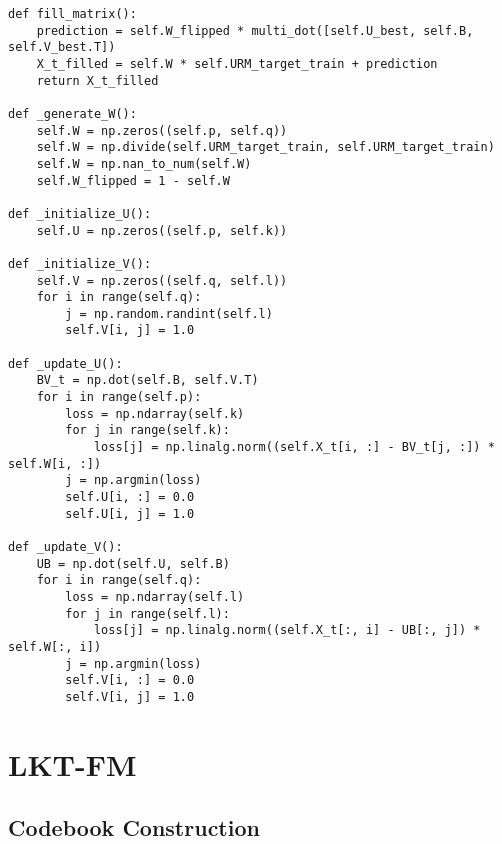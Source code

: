\begin{verbatim}
def fill_matrix():
    prediction = self.W_flipped * multi_dot([self.U_best, self.B, self.V_best.T])
    X_t_filled = self.W * self.URM_target_train + prediction
    return X_t_filled

def _generate_W():
    self.W = np.zeros((self.p, self.q))
    self.W = np.divide(self.URM_target_train, self.URM_target_train)
    self.W = np.nan_to_num(self.W)
    self.W_flipped = 1 - self.W

def _initialize_U():
    self.U = np.zeros((self.p, self.k))

def _initialize_V():
    self.V = np.zeros((self.q, self.l))
    for i in range(self.q):
        j = np.random.randint(self.l)
        self.V[i, j] = 1.0

def _update_U():
    BV_t = np.dot(self.B, self.V.T)
    for i in range(self.p):
        loss = np.ndarray(self.k)
        for j in range(self.k):
            loss[j] = np.linalg.norm((self.X_t[i, :] - BV_t[j, :]) * self.W[i, :])
        j = np.argmin(loss)
        self.U[i, :] = 0.0
        self.U[i, j] = 1.0

def _update_V():
    UB = np.dot(self.U, self.B)
    for i in range(self.q):
        loss = np.ndarray(self.l)
        for j in range(self.l):
            loss[j] = np.linalg.norm((self.X_t[:, i] - UB[:, j]) * self.W[:, i])
        j = np.argmin(loss)
        self.V[i, :] = 0.0
        self.V[i, j] = 1.0
\end{verbatim}



\section{LKT-FM}


\subsection{Codebook Construction}


